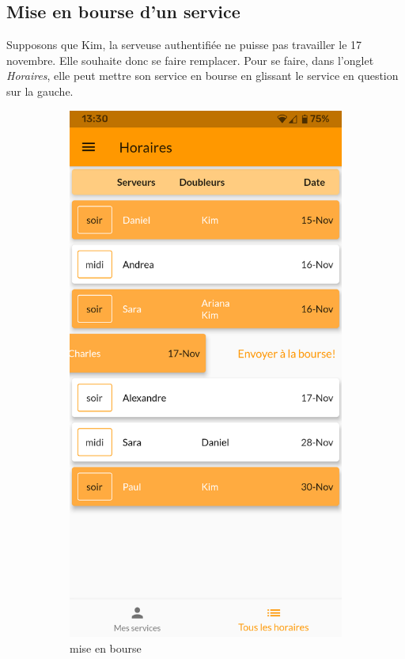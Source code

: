     \subsection*{Mise en bourse d'un service}
    Supposons que Kim, la serveuse authentifiée ne puisse pas travailler le 17 novembre.
    Elle souhaite donc se faire remplacer. Pour se faire, dans l'onglet 
    \textit{Horaires}, elle peut mettre son service en bourse en glissant le 
    service en question sur la gauche.
    \begin{figure}[!h]
        \centering
        \begin{subfigure}{.45\textwidth}
            \centering
            \includegraphics[width=0.6\linewidth]{screenshots/scenario_02/mise_en_bourse.png}
            \caption{mise en bourse}
            \label{fig:mise_en_bourse}
        \end{subfigure}
        \begin{subfigure}{.45\textwidth}
            \centering

\end{subfigure}
\end{figure}
